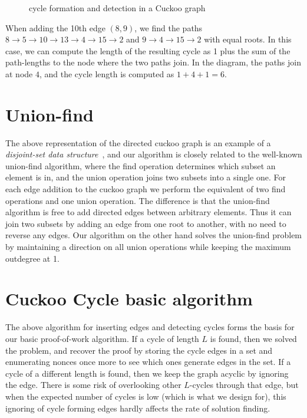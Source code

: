 \documentclass[11pt, oneside]{article}
\begin{document}
\begin{figure}
\begin{center}
\end{center}
\caption{cycle formation and detection in a Cuckoo graph}
\label{cycleformation}
\end{figure}
When adding the 10th edge $(8,9)$, we find the paths $8 \rightarrow 5
\rightarrow 10 \rightarrow 13 \rightarrow 4 \rightarrow 15 \rightarrow 2$ and
$9 \rightarrow 4 \rightarrow 15 \rightarrow 2$ with equal roots.
In this case, we can compute the length of the resulting cycle as
1 plus the sum of the path-lengths to the node where the two paths join.
In the diagram, the paths join at node $4$, and the cycle length is computed as $1+4+1=6$.

\section{Union-find}
The above representation of the directed cuckoo graph is an example of
a {\em disjoint-set data structure}~\cite{wikidsds2014}, and our algorithm is
closely related to the well-known union-find algorithm, where the find operation
determines which subset an element is in, and the union operation joins two subsets
into a single one. For each edge addition to the cuckoo graph we perform the equivalent
of two find operations and one union operation.
The difference is that the union-find algorithm is free to add
directed edges between arbitrary elements. Thus it can join two subsets by adding an edge
from one root to another, with no need to reverse any edges.
Our algorithm on the other hand solves the union-find problem by maintaining
a direction on all union operations while keeping the maximum outdegree at 1.

\section{Cuckoo Cycle basic algorithm}
The above algorithm for inserting edges and detecting cycles forms the basis
for our basic proof-of-work algorithm.
If a cycle of length $L$ is found, then we solved the problem, and recover the proof
by storing the cycle edges in a set and enumerating nonces once more to see which ones
generate edges in the set.
If a cycle of a different length is found, then we keep the graph acyclic by ignoring the edge.
There is some risk of overlooking other $L$-cycles
through that edge, but when the expected number of cycles is low (which is what we design for),
this ignoring of cycle forming edges hardly affects the rate of solution finding.
\end{document}
